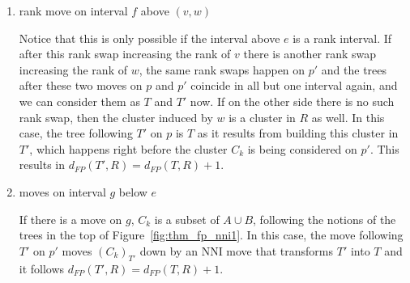 \documentclass{amsart}
\newcommand{\rnni}{\mathrm{RNNI}}
\newcommand{\findpath}{\textsc{FindPath}}
\newcommand{\rank}{\mathrm{rank}}
\newcommand{\nni}{\mathrm{NNI}}
\begin{document}
\begin{enumerate}
    \item rank move on interval $f$ above $(v,w)$

    Notice that this is only possible if the interval above $e$ is a rank interval.
    If after this rank swap increasing the rank of $v$ there is another rank swap increasing the rank of $w$, the same rank swaps happen on $p'$ and the trees after these two moves on $p$ and $p'$ coincide in all but one interval again, and we can consider them as $T$ and $T'$ now.
    If on the other side there is no such rank swap, then the cluster induced by $w$ is a cluster in $R$ as well.
    In this case, the tree following $T'$ on $p$ is $T$ as it results from building this cluster in $T'$, which happens right before the cluster $C_k$ is being considered on $p'$.
    This results in $d_{FP}(T',R) = d_{FP}(T,R) + 1$.

    \item moves on interval $g$ below $e$

    If there is a move on $g$, $C_k$ is a subset of $A \cup B$, following the notions of the trees in the top of Figure~\ref{fig:thm_fp_nni1}.
    In this case, the move following $T'$ on $p'$ moves $(C_k)_{T'}$ down by an $\nni$ move that transforms $T'$ into $T$ and it follows $d_{FP}(T',R) = d_{FP}(T,R) + 1$.

\end{enumerate}

%
%
%
\end{document}
